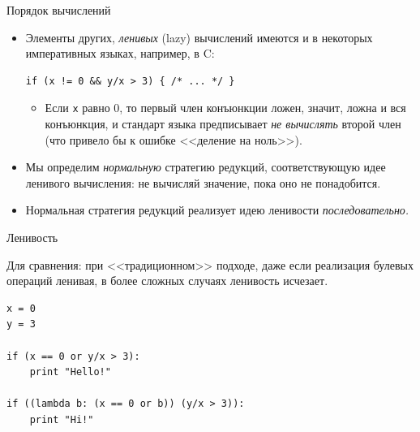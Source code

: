 \documentclass[xcolor=dvipsnames]{beamer}
\begin{document}
\begin{frame}[fragile]{Порядок вычислений}

\begin{itemize}[<+->]
 
 \item Элементы других, {\em ленивых}  (lazy) вычислений имеются и в некоторых императивных языках, например, в C:
 \begin{verbatim}
if (x != 0 && y/x > 3) { /* ... */ }
 \end{verbatim}
\begin{itemize}
\item Если \texttt{x} равно 0, то первый член конъюнкции ложен, значит, ложна и вся конъюнкция, и стандарт языка предписывает {\em не вычислять} второй член (что привело бы к ошибке <<деление на ноль>>).
\end{itemize}
\item Мы определим {\em нормальную} стратегию редукций, соответствующую идее ленивого вычисления: не вычисляй значение, пока оно не понадобится.
 

\item Нормальная стратегия редукций реализует идею ленивости {\em последовательно.}
\end{itemize}

 
\end{frame}


\begin{frame}[fragile]{Ленивость}

Для сравнения: при <<традиционном>> подходе, даже если реализация булевых операций ленивая, в более сложных случаях ленивость исчезает.

\begin{verbatim}
x = 0
y = 3

if (x == 0 or y/x > 3):
    print "Hello!"

if ((lambda b: (x == 0 or b)) (y/x > 3)):
    print "Hi!"
\end{verbatim}
 
\end{frame}
\end{document}
